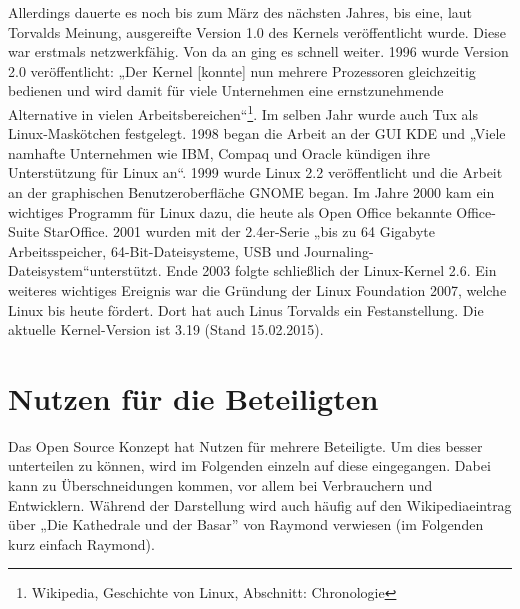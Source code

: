 \documentclass[a4paper,12pt]{article}
\begin{document}
Allerdings dauerte es noch bis zum März des nächsten Jahres, bis eine, laut Torvalds Meinung, ausgereifte Version 1.0 des Kernels veröffentlicht wurde. Diese war erstmals netzwerkfähig. Von da an ging es schnell weiter. 1996 wurde Version 2.0 veröffentlicht: „Der Kernel [konnte] nun mehrere Prozessoren gleichzeitig bedienen und wird damit für viele Unternehmen eine ernstzunehmende Alternative in vielen Arbeitsbereichen“\footnote{Wikipedia, Geschichte von Linux, Abschnitt: Chronologie}. Im selben Jahr wurde auch Tux als Linux-Maskötchen festgelegt. 1998 began die Arbeit an der GUI KDE und „Viele namhafte Unternehmen wie IBM, Compaq und Oracle kündigen ihre Unterstützung für Linux an“\footnotemark[18]. 1999 wurde Linux 2.2 veröffentlicht und die Arbeit an der graphischen Benutzeroberfläche GNOME began. Im Jahre 2000 kam ein wichtiges Programm für Linux dazu, die heute als Open Office bekannte Office-Suite StarOffice. 2001 wurden mit der 2.4er-Serie „bis zu 64 Gigabyte Arbeitsspeicher, 64-Bit-Dateisysteme, USB und Journaling-Dateisystem“\footnotemark[18] unterstützt. Ende 2003 folgte schließlich der Linux-Kernel 2.6. Ein weiteres wichtiges Ereignis war die Gründung der Linux Foundation 2007, welche Linux bis heute fördert. Dort hat auch Linus Torvalds ein Festanstellung. Die aktuelle Kernel-Version ist 3.19 (Stand 15.02.2015).
\section{Nutzen für die Beteiligten}
Das Open Source Konzept hat Nutzen für mehrere Beteiligte. Um dies besser unterteilen zu können, wird im Folgenden einzeln auf diese eingegangen. Dabei kann zu Überschneidungen kommen, vor allem bei Verbrauchern und Entwicklern. Während der Darstellung wird auch häufig auf den Wikipediaeintrag über „Die Kathedrale und der Basar” von Raymond verwiesen (im Folgenden kurz einfach Raymond).
\end{document}
